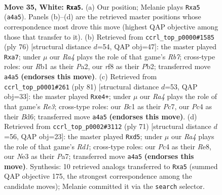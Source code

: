 \documentclass[11pt]{article}
\begin{document}
\clearpage

\begin{figure}[p]\centering
\begin{subfigure}{0.46\textwidth}\centering
\resizebox{\linewidth}{!}{%
\newchessgame
\chessboard[
  setfen={5r1k/6b1/nP6/p7/R1P5/4N1n1/8/1RB3K1 w - - 0 35},
  showmover=false,
  pgfstyle=straightmove, color=movearrow, markmove={a4-a5}
]}
\caption{}
\end{subfigure}\hfill
\begin{subfigure}{0.46\textwidth}\centering
\resizebox{\linewidth}{!}{%
\newchessgame
\chessboard[
  setfen={8/pR6/4kb1p/7P/3rn3/8/PP6/1K2R3 w - - 6 39},
  showmover=false,
  pgfstyle=straightmove, color=movearrow, markmove={b7-a7}
]}
\caption{}
\end{subfigure}
\\[4pt]
\begin{subfigure}{0.46\textwidth}\centering
\resizebox{\linewidth}{!}{%
\newchessgame
\chessboard[
  setfen={8/2p4k/3br1np/5Rp1/4P3/2B5/4K1P1/5B2 b - - 16 41},
  showmover=false,
  pgfstyle=straightmove, color=movearrow, markmove={e6-e4}
]}
\caption{}
\end{subfigure}\hfill
\begin{subfigure}{0.46\textwidth}\centering
\resizebox{\linewidth}{!}{%
\newchessgame
\chessboard[
  setfen={3rr3/p3p3/6k1/p2P4/1n4N1/5R2/1P3K2/3R4 b - - 4 36},
  showmover=false,
  pgfstyle=straightmove, color=movearrow, markmove={d8-d5}
]}
\caption{}
\end{subfigure}
\caption{\textbf{Move 35, White: \texttt{Rxa5}.} (a) Our position; Melanie plays \texttt{Rxa5} (\texttt{a4a5}). Panels (b)--(d) are the retrieved master positions whose correspondence most drove this move (highest QAP objective among those that transfer to it). (b) Retrieved from \texttt{ccrl\_top\_p0000\#1585} (ply 76) [structural distance $d$=54, QAP obj=47]: the master played \texttt{Rxa7}; under $\mu$ our \emph{Ra4} plays the role of that game's \emph{Rb7}; cross-type roles: our \emph{R}b1 as their \emph{P}a2, our \emph{r}f8 as their \emph{P}b2; transferred move \texttt{a4a5} \textbf{(endorses this move)}. (c) Retrieved from \texttt{ccrl\_top\_p0001\#261} (ply 81) [structural distance $d$=53, QAP obj=33]: the master played \texttt{Rxe4+}; under $\mu$ our \emph{Ra4} plays the role of that game's \emph{Re3}; cross-type roles: our \emph{B}c1 as their \emph{P}c7, our \emph{P}c4 as their \emph{B}d6; transferred move \texttt{a4a5} \textbf{(endorses this move)}. (d) Retrieved from \texttt{ccrl\_top\_p0002\#3112} (ply 71) [structural distance $d$=56, QAP obj=23]: the master played \texttt{Rxd5}; under $\mu$ our \emph{Ra4} plays the role of that game's \emph{Rd1}; cross-type roles: our \emph{P}c4 as their \emph{R}e8, our \emph{N}e3 as their \emph{P}a7; transferred move \texttt{a4a5} \textbf{(endorses this move)}. Synthesis: 10 retrieved analogs transferred to \texttt{Rxa5} (summed QAP objective 175, the strongest correspondence among the candidate moves); Melanie committed it via the \texttt{search} selector.}
\label{fig:thought-m68}
\end{figure}
\end{document}
